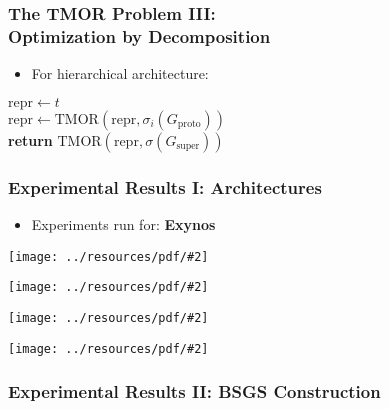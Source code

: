 \documentclass{beamer}
\newcommand{\includeressource}[2][]{\texttt{[image: ../resources/pdf/\#2]}}
\newcommand{\inputressource}[1]{}
\begin{document}
\begin{frame}
  \frametitle{The TMOR Problem III:\\Optimization by Decomposition}

  \begin{itemize}
    \item For hierarchical architecture:
  \end{itemize}

  \vspace{.25cm}

  \begin{algorithmic}[1]
    \State $\mathrm{repr} \gets t$
    \\
      \State $\mathrm{repr} \gets \mathrm{TMOR}(\mathrm{repr},
                                                \sigma_i(G_{\mathrm{proto}}))$
    \EndFor
    \\
    \State \textbf{return} $\mathrm{TMOR}(\mathrm{repr}, \sigma(G_{\mathrm{super}}))$
  \EndProcedure
  \end{algorithmic}
\end{frame}

\begin{frame}
  \frametitle{Experimental Results I: Architectures}

  \begin{itemize}
    \item Experiments run for:
          \textbf<1>{Exynos}
  \end{itemize}

  \vspace{.25cm}

  \begin{overprint}
    \centerline{\includeressource[width=.4\textwidth]{exynos.pdf}}
    \centerline{\includeressource[width=.4\textwidth]{parallella.pdf}}
    \centerline{\includeressource[width=.5\textwidth]{HAEC.pdf}}
    \centerline{\includeressource[width=.8\textwidth]{Kalray.pdf}}
  \end{overprint}

\end{frame}

\begin{frame}
  \frametitle{Experimental Results II: BSGS Construction}

  \begin{figure}
    \centering
    \scalebox{.7}{\inputressource{bsgs_boxplot.tex}}
  \end{figure}
\end{frame}
\end{document}
